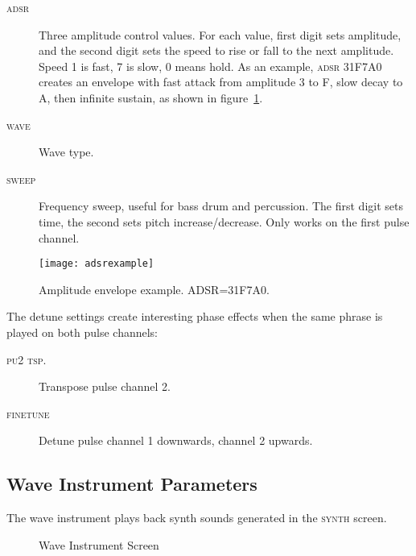 \label{pulse-adsr}
\begin{description}
	\item[\textsc{adsr}] Three amplitude control values. For each value, first digit sets amplitude, and the second digit sets the speed to rise or fall to the next amplitude. Speed 1 is fast, 7 is slow, 0 means hold. As an example, \textsc{adsr} 31F7A0 creates an envelope 
 with fast attack from amplitude 3 to F, slow decay to A, then infinite sustain, as shown in figure~\ref{fig:adsrexample}.
	\item[\textsc{wave}] Wave type.
	\item[\textsc{sweep}] Frequency sweep, useful for bass drum and percussion. The first digit sets time, the second sets pitch increase/decrease. Only works on the first pulse channel. 
\end{description}

\begin{figure}[hbtp]
\centering
\texttt{[image: adsrexample]} 
\caption{Amplitude envelope example. ADSR=31F7A0.}
\label{fig:adsrexample}
\end{figure}

The detune settings create interesting phase effects when the same phrase is played on both pulse channels:

\begin{description}
	\item[\textsc{pu2 tsp.}] Transpose pulse channel 2.
	\item[\textsc{finetune}] Detune pulse channel 1 downwards, channel 2 upwards.
\end{description}

\subsection{Wave Instrument Parameters}

The wave instrument plays back synth sounds generated in the \textsc{synth} screen.

\begin{figure}[hbtp]
	\begin{center}
	\end{center}
	\caption{Wave Instrument Screen}
\end{figure}

